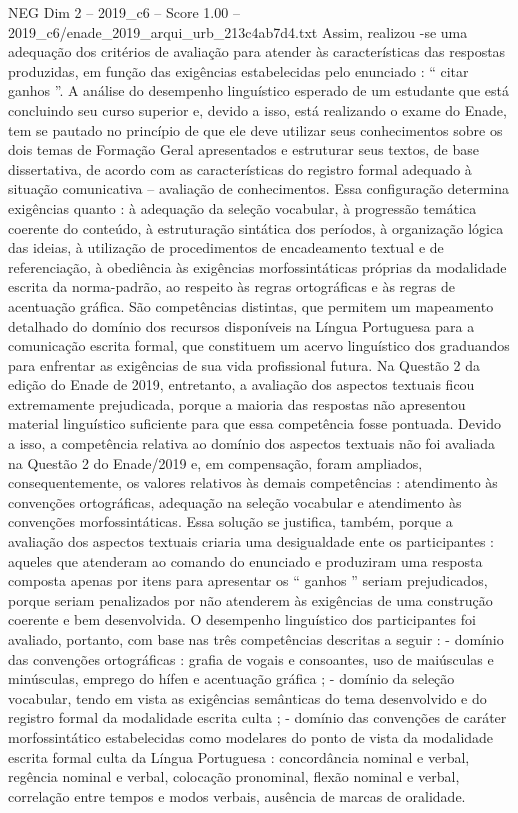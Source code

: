\begin{textsample}{NEG Dim 2 – 2019\_c6 – Score 1.00 – 2019\_c6/enade\_2019\_arqui\_urb\_213c4ab7d4.txt}
Assim, realizou -se uma adequação dos critérios de avaliação para atender às características das respostas produzidas, em função das exigências estabelecidas pelo enunciado : “ citar ganhos ”.
A análise do desempenho linguístico esperado de um estudante que está concluindo seu curso superior e, devido a isso, está realizando o exame do Enade, tem se pautado no princípio de que ele deve utilizar seus conhecimentos sobre os dois temas de Formação Geral apresentados e estruturar seus textos, de base dissertativa, de acordo com as características do registro formal adequado à situação comunicativa – avaliação de conhecimentos.
Essa configuração determina exigências quanto : à adequação da seleção vocabular, à progressão temática coerente do conteúdo, à estruturação sintática dos períodos, à organização lógica das ideias, à utilização de procedimentos de encadeamento textual e de referenciação, à obediência às exigências morfossintáticas próprias da modalidade escrita da norma-padrão, ao respeito às regras ortográficas e às regras de acentuação gráfica.
São competências distintas, que permitem um mapeamento detalhado do domínio dos recursos disponíveis na Língua Portuguesa para a comunicação escrita formal, que constituem um acervo linguístico dos graduandos para enfrentar as exigências de sua vida profissional futura.
Na Questão 2 da edição do Enade de 2019, entretanto, a avaliação dos aspectos textuais ficou extremamente prejudicada, porque a maioria das respostas não apresentou material linguístico suficiente para que essa competência fosse pontuada.
Devido a isso, a competência relativa ao domínio dos aspectos textuais não foi avaliada na Questão 2 do Enade/2019 e, em compensação, foram ampliados, consequentemente, os valores relativos às demais competências : atendimento às convenções ortográficas, adequação na seleção vocabular e atendimento às convenções morfossintáticas.
Essa solução se justifica, também, porque a avaliação dos aspectos textuais criaria uma desigualdade ente os participantes : aqueles que atenderam ao comando do enunciado e produziram uma resposta composta apenas por itens para apresentar os “ ganhos ” seriam prejudicados, porque seriam penalizados por não atenderem às exigências de uma construção coerente e bem desenvolvida.
O desempenho linguístico dos participantes foi avaliado, portanto, com base nas três competências descritas a seguir : - domínio das convenções ortográficas : grafia de vogais e consoantes, uso de maiúsculas e minúsculas, emprego do hífen e acentuação gráfica ; - domínio da seleção vocabular, tendo em vista as exigências semânticas do tema desenvolvido e do registro formal da modalidade escrita culta ; - domínio das convenções de caráter morfossintático estabelecidas como modelares do ponto de vista da modalidade escrita formal culta da Língua Portuguesa : concordância nominal e verbal, regência nominal e verbal, colocação pronominal, flexão nominal e verbal, correlação entre tempos e modos verbais, ausência de marcas de oralidade.

\end{textsample}
